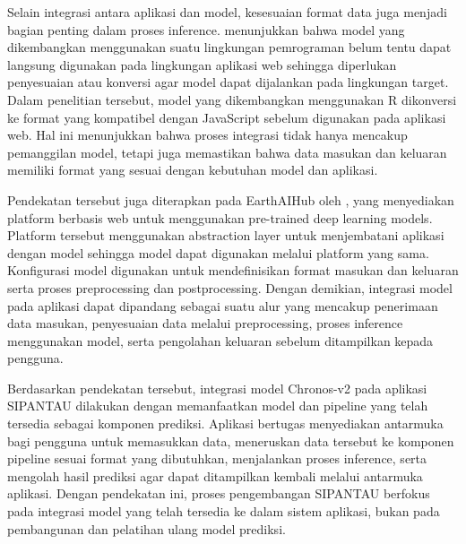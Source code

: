 Selain integrasi antara aplikasi dan model, kesesuaian format data juga menjadi bagian penting dalam proses inference. \cite{Mohammed2022} menunjukkan bahwa model yang dikembangkan menggunakan suatu lingkungan pemrograman belum tentu dapat langsung digunakan pada lingkungan aplikasi web sehingga diperlukan penyesuaian atau konversi agar model dapat dijalankan pada lingkungan target. Dalam penelitian tersebut, model yang dikembangkan menggunakan R dikonversi ke format yang kompatibel dengan JavaScript sebelum digunakan pada aplikasi web. Hal ini menunjukkan bahwa proses integrasi tidak hanya mencakup pemanggilan model, tetapi juga memastikan bahwa data masukan dan keluaran memiliki format yang sesuai dengan kebutuhan model dan aplikasi.

Pendekatan tersebut juga diterapkan pada EarthAIHub oleh \cite{Sit2023}, yang menyediakan platform berbasis web untuk menggunakan pre-trained deep learning models. Platform tersebut menggunakan abstraction layer untuk menjembatani aplikasi dengan model sehingga model dapat digunakan melalui platform yang sama. Konfigurasi model digunakan untuk mendefinisikan format masukan dan keluaran serta proses preprocessing dan postprocessing. Dengan demikian, integrasi model pada aplikasi dapat dipandang sebagai suatu alur yang mencakup penerimaan data masukan, penyesuaian data melalui preprocessing, proses inference menggunakan model, serta pengolahan keluaran sebelum ditampilkan kepada pengguna.

Berdasarkan pendekatan tersebut, integrasi model Chronos-v2 pada aplikasi SIPANTAU dilakukan dengan memanfaatkan model dan pipeline yang telah tersedia sebagai komponen prediksi. Aplikasi bertugas menyediakan antarmuka bagi pengguna untuk memasukkan data, meneruskan data tersebut ke komponen pipeline sesuai format yang dibutuhkan, menjalankan proses inference, serta mengolah hasil prediksi agar dapat ditampilkan kembali melalui antarmuka aplikasi. Dengan pendekatan ini, proses pengembangan SIPANTAU berfokus pada integrasi model yang telah tersedia ke dalam sistem aplikasi, bukan pada pembangunan dan pelatihan ulang model prediksi.




